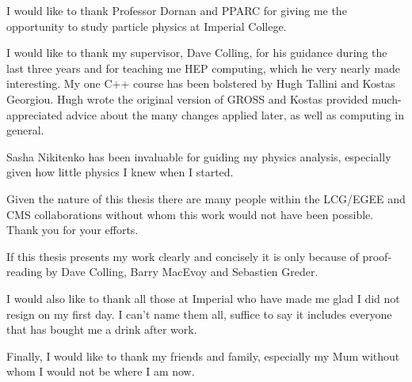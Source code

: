 
I would like to thank Professor Dornan and PPARC for giving me the opportunity to study particle physics at Imperial College.

I would like to thank my supervisor, Dave Colling, for his guidance during the last three years and for teaching me HEP computing, which he very nearly made interesting. My one C++ course has been bolstered by Hugh Tallini and Kostas Georgiou. Hugh wrote the original version of GROSS and Kostas provided much-appreciated advice about the many changes applied later, as well as computing in general.

Sasha Nikitenko has been invaluable for guiding my physics analysis, especially given how little physics I knew when I started.

Given the nature of this thesis there are many people within the LCG/EGEE and CMS collaborations without whom this work would not have been possible. Thank you for your efforts.

If this thesis presents my work clearly and concisely it is only because of proof-reading by Dave Colling, Barry MacEvoy and Sebastien Greder.

I would also like to thank all those at Imperial who have made me glad I did not resign on my first day. I can't name them all, suffice to say it includes everyone that has bought me a drink after work.

Finally, I would like to thank my friends and family, especially my Mum without whom I would not be where I am now.